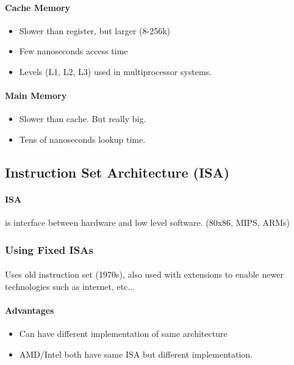 \documentclass{article}
\newcommand\tab[1][0.5cm]{\hspace*{#1}}
\begin{document}
		\paragraph{\tab Cache Memory}
		\begin{itemize}
			\item Slower than register, but larger (8-256k)
			\item Few nanoseconds access time
			\item Levels (L1, L2, L3) used in multiprocessor systems.
		\end{itemize}

		\paragraph{\tab Main Memory}
		\begin{itemize}
			\item Slower than cache. But really big.
			\item Tens of nanoseconds lookup time.
		\end{itemize}

	\subsection{Instruction Set Architecture (ISA)}
		\paragraph{\tab ISA} is interface between hardware and low level software. (80x86, MIPS, ARMs)

		\subsubsection{Using Fixed ISAs}
			\paragraph{} Uses old instruction set (1970s), also used with extensions to enable newer technologies such as internet, etc...

			\paragraph{\tab Advantages}
			\begin{itemize}
				\item Can have different implementation of same architecture
				\item AMD/Intel both have same ISA but different implementation.
			\end{itemize}
\end{document}
